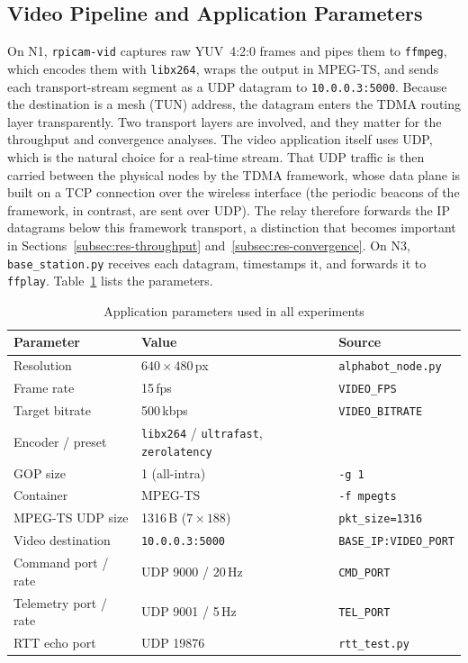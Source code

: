 \subsection{Video Pipeline and Application Parameters}
\label{subsec:video-pipeline}

On N1, \texttt{rpicam-vid} captures raw YUV~4:2:0 frames and pipes them to
\texttt{ffmpeg}, which encodes them with \texttt{libx264}, wraps the output in
MPEG-TS, and sends each transport-stream segment as a UDP datagram to
\texttt{10.0.0.3:5000}. Because the destination is a mesh (TUN) address, the
datagram enters the TDMA routing layer transparently. Two transport layers are involved, and they matter for the throughput and
convergence analyses. The video application itself uses UDP, which is the
natural choice for a real-time stream. That UDP traffic is then carried between
the physical nodes by the TDMA framework, whose data plane is built on a TCP
connection over the wireless interface (the periodic beacons of the framework, in
contrast, are sent over UDP). The relay therefore forwards the IP datagrams
below this framework transport, a distinction that becomes important in
Sections~\ref{subsec:res-throughput} and~\ref{subsec:res-convergence}. On N3,
\texttt{base\_station.py} receives each datagram, timestamps it, and forwards
it to \texttt{ffplay}. Table~\ref{tab:app-params} lists the parameters.

\begin{table}[h]
\centering
\caption{Application parameters used in all experiments}
\label{tab:app-params}
\small
\begin{tabular}{lll}
\toprule
\textbf{Parameter} & \textbf{Value} & \textbf{Source} \\
\midrule
Resolution            & $640 \times 480$\,px  & \texttt{alphabot\_node.py} \\
Frame rate            & 15\,fps               & \texttt{VIDEO\_FPS} \\
Target bitrate        & 500\,kbps             & \texttt{VIDEO\_BITRATE} \\
Encoder / preset      & \texttt{libx264} / \texttt{ultrafast}, \texttt{zerolatency} & \\
GOP size              & 1 (all-intra)         & \texttt{-g 1} \\
Container             & MPEG-TS               & \texttt{-f mpegts} \\
MPEG-TS UDP size      & 1316\,B ($7\times188$)& \texttt{pkt\_size=1316} \\
Video destination     & \texttt{10.0.0.3:5000}& \texttt{BASE\_IP:VIDEO\_PORT} \\
Command port / rate   & UDP 9000 / 20\,Hz     & \texttt{CMD\_PORT} \\
Telemetry port / rate & UDP 9001 / 5\,Hz      & \texttt{TEL\_PORT} \\
RTT echo port         & UDP 19876             & \texttt{rtt\_test.py} \\
\bottomrule
\end{tabular}
\end{table}

